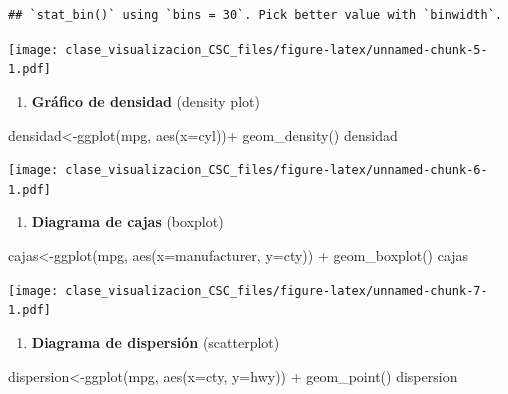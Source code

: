 \documentclass[
]{book}
\newenvironment{Shaded}{\begin{snugshade}}{\end{snugshade}}
\newcommand{\AttributeTok}[1]{\textcolor[rgb]{0.77,0.63,0.00}{#1}}
\newcommand{\FunctionTok}[1]{\textcolor[rgb]{0.00,0.00,0.00}{#1}}
\newcommand{\NormalTok}[1]{#1}
\newcommand{\OtherTok}[1]{\textcolor[rgb]{0.56,0.35,0.01}{#1}}
\newcommand{\SpecialCharTok}[1]{\textcolor[rgb]{0.00,0.00,0.00}{#1}}
\providecommand{\tightlist}{%
  \setlength{\itemsep}{0pt}\setlength{\parskip}{0pt}}
\begin{document}
\begin{verbatim}
## `stat_bin()` using `bins = 30`. Pick better value with `binwidth`.
\end{verbatim}

\texttt{[image: clase\_visualizacion\_CSC\_files/figure-latex/unnamed-chunk-5-1.pdf]}

\begin{enumerate}
\def\labelenumi{\arabic{enumi}.}
\setcounter{enumi}{1}
\tightlist
\item
  \textbf{Gráfico de densidad} (density plot)
\end{enumerate}

\begin{Shaded}
\begin{Highlighting}[]
\NormalTok{densidad}\OtherTok{\textless{}{-}}\FunctionTok{ggplot}\NormalTok{(mpg, }\FunctionTok{aes}\NormalTok{(}\AttributeTok{x=}\NormalTok{cyl))}\SpecialCharTok{+}
  \FunctionTok{geom\_density}\NormalTok{()}
\NormalTok{densidad}
\end{Highlighting}
\end{Shaded}

\texttt{[image: clase\_visualizacion\_CSC\_files/figure-latex/unnamed-chunk-6-1.pdf]}

\begin{enumerate}
\def\labelenumi{\arabic{enumi}.}
\setcounter{enumi}{2}
\tightlist
\item
  \textbf{Diagrama de cajas} (boxplot)
\end{enumerate}

\begin{Shaded}
\begin{Highlighting}[]
\NormalTok{cajas}\OtherTok{\textless{}{-}}\FunctionTok{ggplot}\NormalTok{(mpg, }\FunctionTok{aes}\NormalTok{(}\AttributeTok{x=}\NormalTok{manufacturer, }\AttributeTok{y=}\NormalTok{cty)) }\SpecialCharTok{+} 
    \FunctionTok{geom\_boxplot}\NormalTok{()}
\NormalTok{cajas}
\end{Highlighting}
\end{Shaded}

\texttt{[image: clase\_visualizacion\_CSC\_files/figure-latex/unnamed-chunk-7-1.pdf]}

\begin{enumerate}
\def\labelenumi{\arabic{enumi}.}
\setcounter{enumi}{3}
\tightlist
\item
  \textbf{Diagrama de dispersión} (scatterplot)
\end{enumerate}

\begin{Shaded}
\begin{Highlighting}[]
\NormalTok{dispersion}\OtherTok{\textless{}{-}}\FunctionTok{ggplot}\NormalTok{(mpg, }\FunctionTok{aes}\NormalTok{(}\AttributeTok{x=}\NormalTok{cty, }\AttributeTok{y=}\NormalTok{hwy)) }\SpecialCharTok{+} 
    \FunctionTok{geom\_point}\NormalTok{()}
\NormalTok{dispersion}
\end{Highlighting}
\end{Shaded}
\end{document}
